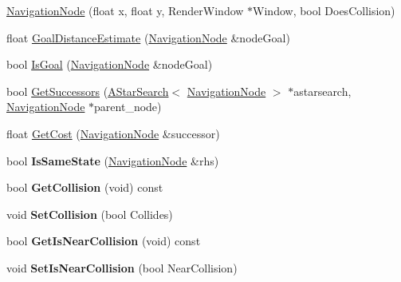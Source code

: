 \begin{DoxyCompactItemize}
\item 
\hyperlink{struct_engine_1_1_core_1_1_navigation_node_a67ff011cd89aced43978f3f6265f6c63}{Navigation\+Node} (float x, float y, Render\+Window $\ast$Window, bool Does\+Collision)
\item 
float \hyperlink{struct_engine_1_1_core_1_1_navigation_node_acd420576ac7c916755d9c7a9908a6aad}{Goal\+Distance\+Estimate} (\hyperlink{struct_engine_1_1_core_1_1_navigation_node}{Navigation\+Node} \&node\+Goal)
\item 
bool \hyperlink{struct_engine_1_1_core_1_1_navigation_node_aa838e27a48677c1359fc1bab0b8a8591}{Is\+Goal} (\hyperlink{struct_engine_1_1_core_1_1_navigation_node}{Navigation\+Node} \&node\+Goal)
\item 
bool \hyperlink{struct_engine_1_1_core_1_1_navigation_node_a4e049fbcda1bb269303da91692d05033}{Get\+Successors} (\hyperlink{class_a_star_search}{A\+Star\+Search}$<$ \hyperlink{struct_engine_1_1_core_1_1_navigation_node}{Navigation\+Node} $>$ $\ast$astarsearch, \hyperlink{struct_engine_1_1_core_1_1_navigation_node}{Navigation\+Node} $\ast$parent\+\_\+node)
\item 
float \hyperlink{struct_engine_1_1_core_1_1_navigation_node_a2d2f49adb68c3b880b750875ad15a50b}{Get\+Cost} (\hyperlink{struct_engine_1_1_core_1_1_navigation_node}{Navigation\+Node} \&successor)
\item 
\mbox{\label{struct_engine_1_1_core_1_1_navigation_node_ab265c716b1b82675c800f7027e0666d8}} 
bool {\bfseries Is\+Same\+State} (\hyperlink{struct_engine_1_1_core_1_1_navigation_node}{Navigation\+Node} \&rhs)
\item 
\mbox{\label{struct_engine_1_1_core_1_1_navigation_node_aec68263cc16b965ebb1cb3aad7fcd43e}} 
bool {\bfseries Get\+Collision} (void) const
\item 
\mbox{\label{struct_engine_1_1_core_1_1_navigation_node_ab28fdd33b51904a568654711b3180822}} 
void {\bfseries Set\+Collision} (bool Collides)
\item 
\mbox{\label{struct_engine_1_1_core_1_1_navigation_node_aee18a68d77e248666450829dc954338a}} 
bool {\bfseries Get\+Is\+Near\+Collision} (void) const
\item 
\mbox{\label{struct_engine_1_1_core_1_1_navigation_node_a0528bb5286ad2b1c42b2bb3c929d059b}} 
void {\bfseries Set\+Is\+Near\+Collision} (bool Near\+Collision)
\end{DoxyCompactItemize}
